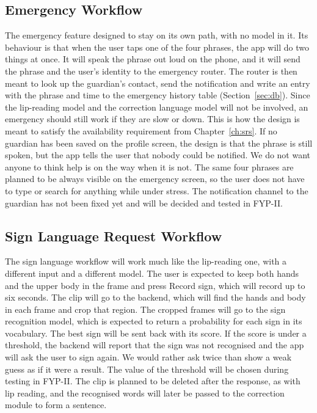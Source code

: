\documentclass{FastFyp}
\begin{document}
\subsection{Emergency Workflow}
The emergency feature designed to stay on its own path, with no model in it. Its behaviour is that when the user taps one of the four phrases, the app will do two things at once. It will speak the phrase out loud on the phone, and it will send the phrase and the user's identity to the emergency router. The router is then meant to look up the guardian's contact, send the notification and write an entry with the phrase and time to the emergency history table (Section~\ref{sec:db}). Since the lip-reading model and the correction language model will not be involved, an emergency should still work if they are slow or down. This is how the design is meant to satisfy the availability requirement from Chapter~\ref{ch:srs}. If no guardian has been saved on the profile screen, the design is that the phrase is still spoken, but the app tells the user that nobody could be notified. We do not want anyone to think help is on the way when it is not. The same four phrases are planned to be always visible on the emergency screen, so the user does not have to type or search for anything while under stress. The notification channel to the guardian has not been fixed yet and will be decided and tested in FYP-II.

\subsection{Sign Language Request Workflow}
The sign language workflow will work much like the lip-reading one, with a different input and a different model. The user is expected to keep both hands and the upper body in the frame and press Record sign, which will record up to six seconds. The clip will go to the backend, which will find the hands and body in each frame and crop that region. The cropped frames will go to the sign recognition model, which is expected to return a probability for each sign in its vocabulary. The best sign will be sent back with its score. If the score is under a threshold, the backend will report that the sign was not recognised and the app will ask the user to sign again. We would rather ask twice than show a weak guess as if it were a result. The value of the threshold will be chosen during testing in FYP-II. The clip is planned to be deleted after the response, as with lip reading, and the recognised words will later be passed to the correction module to form a sentence.
\end{document}
